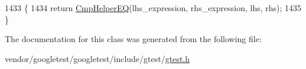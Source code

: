 \begin{DoxyCode}
1433                                                  \{
1434     \textcolor{keywordflow}{return} \hyperlink{namespacetesting_1_1internal_a4638c74d9b32e971f9b321af6fafc2f1}{CmpHelperEQ}(lhs\_expression, rhs\_expression, lhs, rhs);
1435   \}
\end{DoxyCode}


The documentation for this class was generated from the following file\+:\begin{DoxyCompactItemize}
\item 
vendor/googletest/googletest/include/gtest/\hyperlink{gtest_8h}{gtest.\+h}\end{DoxyCompactItemize}
